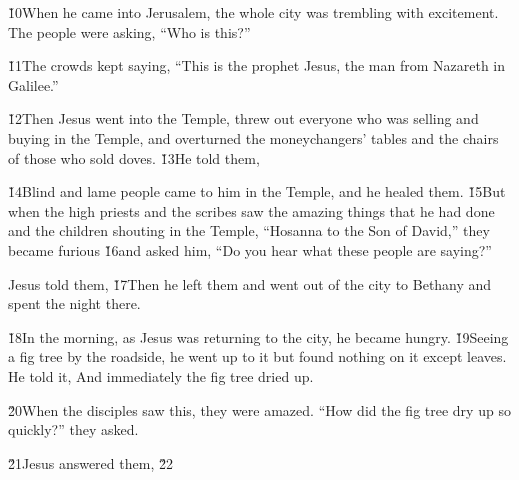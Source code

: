 \v{10}When he came into Jerusalem, the whole city was trembling with excitement. The people were asking, ``Who is this?''

\v{11}The crowds kept saying, ``This is the prophet Jesus, the man from Nazareth in Galilee.''

\v{12}Then Jesus went into the Temple, threw out everyone who was selling and buying in the Temple, and overturned the moneychangers' tables and the chairs of those who sold doves. \v{13}He told them,   

\v{14}Blind and lame people came to him in the Temple, and he healed them. \v{15}But when the high priests and the scribes saw the amazing things that he had done and the children shouting in the Temple, ``Hosanna to the Son of David,'' they became furious \v{16}and asked him, ``Do you hear what these people are saying?''

Jesus told them,  \v{17}Then he left them and went out of the city to Bethany and spent the night there.

\v{18}In the morning, as Jesus was returning to the city, he became hungry. \v{19}Seeing a fig tree by the roadside, he went up to it but found nothing on it except leaves. He told it,  And immediately the fig tree dried up.

\v{20}When the disciples saw this, they were amazed. ``How did the fig tree dry up so quickly?'' they asked.

\v{21}Jesus answered them,  \v{22}

